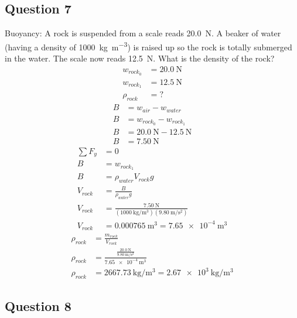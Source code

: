 \documentclass{article}
\begin{document}
\subsection{Question 7}

Buoyancy: A rock is suspended from a scale reads \SI{20.0}{\newton}. A beaker of water (having a density of \SI{1000}{\kilogram \per \meter \cubed}) is raised up so the rock is totally submerged in the water. The scale now reads \SI{12.5}{\newton}. What is the density of the rock?
\begin{align*}
	w_{rock_0} & = \SI{20.0}{\newton} \\
	w_{rock_1} & = \SI{12.5}{\newton} \\
	\rho_{rock} & = ?
\end{align*}
\begin{align*}
	B & = w_{air} - w_{water} \\
	B & = w_{rock_0} - w_{rock_1} \\
	B & = \SI{20.0}{\newton} - \SI{12.5}{\newton} \\
	B & = \SI{7.50}{\newton}
\end{align*}
\begin{align*}
	\sum F_y & = 0 \\
	B & = w_{rock_1} \\
	B & = \rho_{water}V_{rock}g \\
	V_{rock} & = \frac{ B }{ \rho_{water}g } \\
	V_{rock} & = \frac{ \SI{7.50}{\newton} }{ (\SI{1000}{\kilogram \per \meter \cubed})(\SI{9.80}{\meter \per \second \squared}) } \\
	V_{rock} & = \SI{0.000765}{\meter \cubed} = \SI{7.65e-4}{\meter \cubed}
\end{align*}
\begin{align*}
	\rho_{rock} & = \frac{ m_{rock} }{ V_{rock} } \\
	\rho_{rock} & = \frac{ \frac{ \SI{20.0}{\newton} }{ \SI{9.80}{\meter \per \second \squared} } }{ \SI{7.65e-4}{\meter \cubed} } \\
	\rho_{rock} & = \SI{2667.73}{\kilogram \per \meter \cubed} = \SI{2.67e3}{\kilogram \per \meter \cubed}
\end{align*}

\subsection{Question 8}
\end{document}
